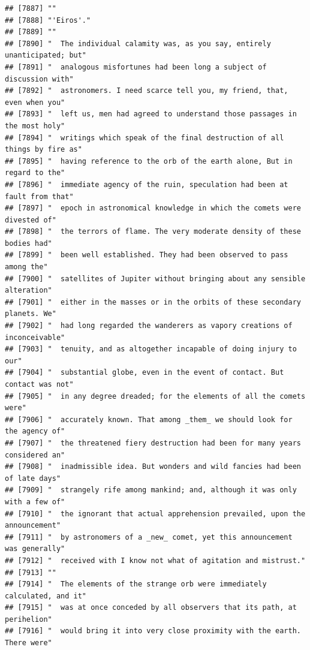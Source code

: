 \documentclass{article}\usepackage[]{graphicx}\usepackage[]{color}
\makeatletter
\newenvironment{kframe}{%
 \def\at@end@of@kframe{}%
 \ifinner\ifhmode%
  \def\at@end@of@kframe{\end{minipage}}%
  \begin{minipage}{\columnwidth}%
 \fi\fi%
 \def\FrameCommand##1{\hskip\@totalleftmargin \hskip-\fboxsep
 \colorbox{shadecolor}{##1}\hskip-\fboxsep
     \hskip-\linewidth \hskip-\@totalleftmargin \hskip\columnwidth}%
 \MakeFramed {\advance\hsize-\width
   \@totalleftmargin\z@ \linewidth\hsize
   \@setminipage}}%
 {\par\unskip\endMakeFramed%
 \at@end@of@kframe}
\newenvironment{knitrout}{}{} %
\makeatother
\begin{document}
\begin{knitrout}
\begin{kframe}
\begin{verbatim}
## [7887] ""                                                                            
## [7888] "'Eiros'."                                                                    
## [7889] ""                                                                            
## [7890] "  The individual calamity was, as you say, entirely unanticipated; but"      
## [7891] "  analogous misfortunes had been long a subject of discussion with"          
## [7892] "  astronomers. I need scarce tell you, my friend, that, even when you"       
## [7893] "  left us, men had agreed to understand those passages in the most holy"     
## [7894] "  writings which speak of the final destruction of all things by fire as"    
## [7895] "  having reference to the orb of the earth alone, But in regard to the"      
## [7896] "  immediate agency of the ruin, speculation had been at fault from that"     
## [7897] "  epoch in astronomical knowledge in which the comets were divested of"      
## [7898] "  the terrors of flame. The very moderate density of these bodies had"       
## [7899] "  been well established. They had been observed to pass among the"           
## [7900] "  satellites of Jupiter without bringing about any sensible alteration"      
## [7901] "  either in the masses or in the orbits of these secondary planets. We"      
## [7902] "  had long regarded the wanderers as vapory creations of inconceivable"      
## [7903] "  tenuity, and as altogether incapable of doing injury to our"               
## [7904] "  substantial globe, even in the event of contact. But contact was not"      
## [7905] "  in any degree dreaded; for the elements of all the comets were"            
## [7906] "  accurately known. That among _them_ we should look for the agency of"      
## [7907] "  the threatened fiery destruction had been for many years considered an"    
## [7908] "  inadmissible idea. But wonders and wild fancies had been of late days"     
## [7909] "  strangely rife among mankind; and, although it was only with a few of"     
## [7910] "  the ignorant that actual apprehension prevailed, upon the announcement"    
## [7911] "  by astronomers of a _new_ comet, yet this announcement was generally"      
## [7912] "  received with I know not what of agitation and mistrust."                  
## [7913] ""                                                                            
## [7914] "  The elements of the strange orb were immediately calculated, and it"       
## [7915] "  was at once conceded by all observers that its path, at perihelion"        
## [7916] "  would bring it into very close proximity with the earth. There were"       

\end{verbatim}
\end{kframe}
\end{knitrout}
\end{document}
